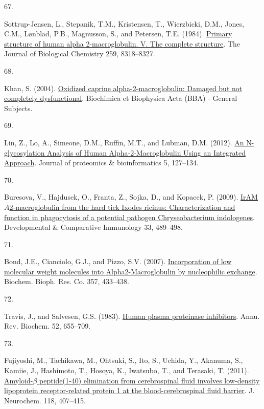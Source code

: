 \documentclass[
]{article}
\newlength{\cslhangindent}
\newlength{\csllabelwidth}
\newlength{\cslentryspacingunit} %
\newenvironment{CSLReferences}[2] %
 {%
  \setlength{\parindent}{0pt}
  \ifodd #1
  \let\oldpar\par
  \def\par{\hangindent=\cslhangindent\oldpar}
  \fi
  \setlength{\parskip}{#2\cslentryspacingunit}
 }%
 {}
\newcommand{\CSLLeftMargin}[1]{\parbox[t]{\csllabelwidth}{#1}}
\newcommand{\CSLRightInline}[1]{\parbox[t]{\linewidth - \csllabelwidth}{#1}\break}
\begin{document}
\begin{CSLReferences}{0}{0}
\leavevmode{}%
\CSLLeftMargin{67. }
\CSLRightInline{Sottrup-Jensen, L., Stepanik, T.M., Kristensen, T., Wierzbicki, D.M., Jones, C.M., Lønblad, P.B., Magnusson, S., and Petersen, T.E. (1984). \href{https://www.ncbi.nlm.nih.gov/pubmed/6203908}{Primary structure of human alpha 2-macroglobulin. {V}. {The} complete structure}. The Journal of Biological Chemistry 259, 8318--8327.}

\leavevmode{}%
\CSLLeftMargin{68. }
\CSLRightInline{Khan, S. (2004). \href{https://doi.org/10.1016/j.bbagen.2004.06.008}{Oxidized caprine alpha-2-macroglobulin: Damaged but not completely dysfunctional}. Biochimica et Biophysica Acta (BBA) - General Subjects.}

\leavevmode{}%
\CSLLeftMargin{69. }
\CSLRightInline{Lin, Z., Lo, A., Simeone, D.M., Ruffin, M.T., and Lubman, D.M. (2012). \href{https://doi.org/10.4172/jpb.1000224}{An {N-glycosylation Analysis} of {Human Alpha-2-Macroglobulin Using} an {Integrated Approach}}. Journal of proteomics \& bioinformatics 5, 127--134.}

\leavevmode{}%
\CSLLeftMargin{70. }
\CSLRightInline{Buresova, V., Hajdusek, O., Franta, Z., Sojka, D., and Kopacek, P. (2009). \href{https://doi.org/10.1016/j.dci.2008.09.011}{{IrAM}\textemdash{{An}} {\(A\)}2-macroglobulin from the hard tick {Ixodes} ricinus: {Characterization} and function in phagocytosis of a potential pathogen {Chryseobacterium} indologenes}. Developmental \& Comparative Immunology 33, 489--498.}

\leavevmode{}%
\CSLLeftMargin{71. }
\CSLRightInline{Bond, J.E., Cianciolo, G.J., and Pizzo, S.V. (2007). \href{https://doi.org/10.1016/j.bbrc.2007.03.151}{Incorporation of low molecular weight molecules into Alpha2-{Macroglobulin} by nucleophilic exchange}. Biochem. Bioph. Res. Co. 357, 433--438.}

\leavevmode{}%
\CSLLeftMargin{72. }
\CSLRightInline{Travis, J., and Salvesen, G.S. (1983). \href{https://doi.org/10.1146/annurev.bi.52.070183.003255}{Human plasma proteinase inhibitors}. Annu. Rev. Biochem. 52, 655--709.}

\leavevmode{}%
\CSLLeftMargin{73. }
\CSLRightInline{Fujiyoshi, M., Tachikawa, M., Ohtsuki, S., Ito, S., Uchida, Y., Akanuma, S., Kamiie, J., Hashimoto, T., Hosoya, K., Iwatsubo, T., and Terasaki, T. (2011). \href{https://doi.org/10.1111/j.1471-4159.2011.07311.x}{Amyloid-{\(\beta\)} peptide(1-40) elimination from cerebrospinal fluid involves low-density lipoprotein receptor-related protein 1 at the blood-cerebrospinal fluid barrier}. J. Neurochem. 118, 407--415.}


\end{CSLReferences}
\end{document}
